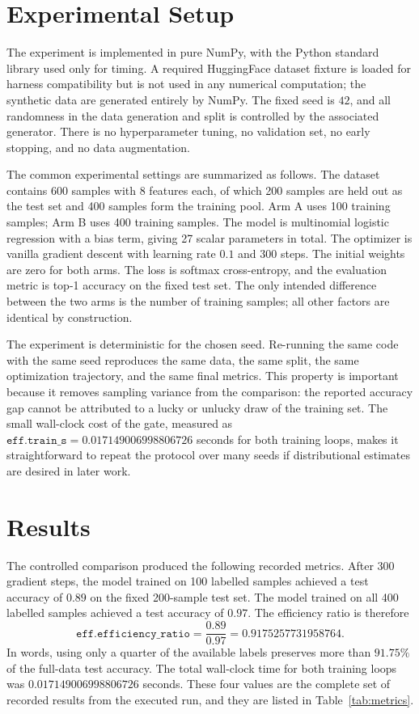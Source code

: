 \documentclass[10pt]{article}
\begin{document}
\section{Experimental Setup}
The experiment is implemented in pure NumPy, with the Python standard library used only for timing. A required HuggingFace dataset fixture is loaded for harness compatibility but is not used in any numerical computation; the synthetic data are generated entirely by NumPy. The fixed seed is \(42\), and all randomness in the data generation and split is controlled by the associated generator. There is no hyperparameter tuning, no validation set, no early stopping, and no data augmentation.

The common experimental settings are summarized as follows. The dataset contains 600 samples with 8 features each, of which 200 samples are held out as the test set and 400 samples form the training pool. Arm A uses 100 training samples; Arm B uses 400 training samples. The model is multinomial logistic regression with a bias term, giving 27 scalar parameters in total. The optimizer is vanilla gradient descent with learning rate \(0.1\) and 300 steps. The initial weights are zero for both arms. The loss is softmax cross-entropy, and the evaluation metric is top-1 accuracy on the fixed test set. The only intended difference between the two arms is the number of training samples; all other factors are identical by construction.

The experiment is deterministic for the chosen seed. Re-running the same code with the same seed reproduces the same data, the same split, the same optimization trajectory, and the same final metrics. This property is important because it removes sampling variance from the comparison: the reported accuracy gap cannot be attributed to a lucky or unlucky draw of the training set. The small wall-clock cost of the gate, measured as \(\texttt{eff.train\_s} = 0.017149006998806726\) seconds for both training loops, makes it straightforward to repeat the protocol over many seeds if distributional estimates are desired in later work.

\section{Results}
The controlled comparison produced the following recorded metrics. After 300 gradient steps, the model trained on 100 labelled samples achieved a test accuracy of \(0.89\) on the fixed 200-sample test set. The model trained on all 400 labelled samples achieved a test accuracy of \(0.97\). The efficiency ratio is therefore
\[
\texttt{eff.efficiency\_ratio}
= \frac{0.89}{0.97}
= 0.9175257731958764.
\]
In words, using only a quarter of the available labels preserves more than \(91.75\%\) of the full-data test accuracy. The total wall-clock time for both training loops was \(0.017149006998806726\) seconds. These four values are the complete set of recorded results from the executed run, and they are listed in Table~\ref{tab:metrics}.
\end{document}

